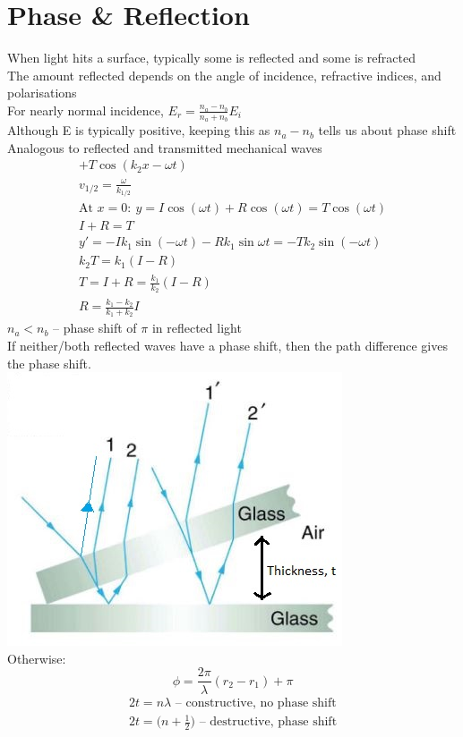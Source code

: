 \documentclass[a4paper, 11pt, fleqn, normalem]{report}
\begin{document}
\section{Phase \& Reflection}
When light hits a surface, typically some is reflected and some is refracted \\
The amount reflected depends on the angle of incidence, refractive indices, and polarisations \\
For nearly normal incidence, $E_{r} = \frac{n_{a} - n_{b}}{n_{a} + n_{b}}E_{i}$ \\
Although E is typically positive, keeping this as $n_{a} - n_{b}$ tells us about phase shift \\
Analogous to reflected and transmitted mechanical waves
\begin{gather*}
    [I\cos{(k_{1}x - \omega t)} + R\cos{(k_{1}x - \omega t)}] + T\cos{(k_{2}x - \omega t)} \\
    v_{1/2} = \frac{\omega}{k_{1/2}} \\
    \text{At }x = 0:~y = I\cos{(\omega t)} + R\cos{(\omega t)} = T\cos{(\omega t)} \\
    I + R = T \\
    y' = -Ik_{1}\sin{(-\omega t)} - Rk_{1}\sin{\omega t} = -Tk_{2}\sin{(-\omega t)} \\
    k_{2}T = k_{1}(I - R) \\
    T = I + R = \frac{k_{1}}{k_{2}}(I - R) \\
    R = \frac{k_{1} - k_{2}}{k_{1} + k_{2}}I
\end{gather*}
$n_{a} < n_{b}$ -- phase shift of $\pi$ in reflected light \\
If neither/both reflected waves have a phase shift, then the path difference gives the phase shift. \\
\includegraphics[scale=0.8]{Thickness.jpg} \\
Otherwise:
\begin{equation*}
    \phi = \frac{2\pi}{\lambda}(r_{2} - r_{1}) + \pi
\end{equation*}
\begin{gather*}
    2t = n\lambda \text{ -- constructive, no phase shift} \\
    2t = \Big(n + \frac{1}{2}\Big)\text{ -- destructive, phase shift}
\end{gather*}
\end{document}
